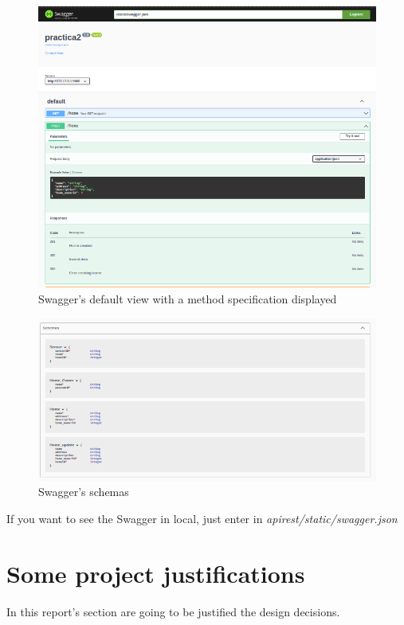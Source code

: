 \documentclass[a4paper,12pt]{article}
\begin{document}
\begin{figure}[H]
    \centering
    \includegraphics[scale = 0.5]{images/Swagger deffault amb menu desplegat.png}
    \caption{Swagger's default view with a method specification displayed}
    \label{fig:my_label}
\end{figure}
\begin{figure}[H]
    \centering
    \includegraphics[scale = 0.5]{images/Swagger schemas.png}
    \caption{Swagger's schemas}
    \label{fig:my_label}
\end{figure}
If you want to see the Swagger in local, just enter in \textit{apirest/static/swagger.json}
\newpage
\section*{Some project justifications}
In this report's section are going to be justified the design decisions.
\end{document}
